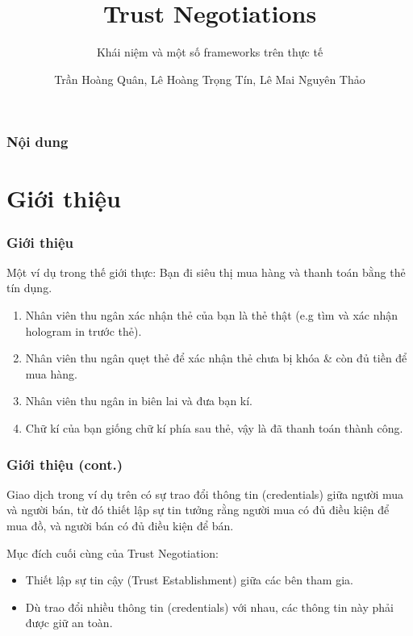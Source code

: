 \documentclass[11pt]{beamer}
\begin{document}
\author{Trần Hoàng Quân, Lê Hoàng Trọng Tín, Lê Mai Nguyên Thảo}
\title{Trust Negotiations}
\subtitle{Khái niệm và một số frameworks trên thực tế}
\begin{frame}[plain]
	\maketitle
\end{frame}

\begin{frame}
\frametitle{Nội dung}
\tableofcontents
\end{frame}

\section{Giới thiệu}
\begin{frame}
\frametitle{Giới thiệu}
Một ví dụ trong thế giới thực: Bạn đi siêu thị mua hàng và thanh toán bằng thẻ tín dụng.
\begin{enumerate}
\item Nhân viên thu ngân xác nhận thẻ của bạn là thẻ thật (e.g tìm và xác nhận hologram in trước thẻ).
\item Nhân viên thu ngân quẹt thẻ để xác nhận thẻ chưa bị khóa \& còn đủ tiền để mua hàng.
\item Nhân viên thu ngân in biên lai và đưa bạn kí.
\item Chữ kí của bạn giống chữ kí phía sau thẻ, vậy là đã thanh toán thành công.
\end{enumerate}
\end{frame}

\begin{frame}
\frametitle{Giới thiệu (cont.)}
Giao dịch trong ví dụ trên có sự trao đổi thông tin (credentials) giữa người mua và người bán, từ đó thiết lập sự tin tưởng rằng người mua có đủ điều kiện để mua đồ, và người bán có đủ điều kiện để bán.

Mục đích cuối cùng của Trust Negotiation:
\begin{itemize}
\item Thiết lập sự tin cậy (Trust Establishment) giữa các bên tham gia.
\item Dù trao đổi nhiều thông tin (credentials) với nhau, các thông tin này phải được giữ an toàn.
\end{itemize}
\end{frame}
\end{document}
